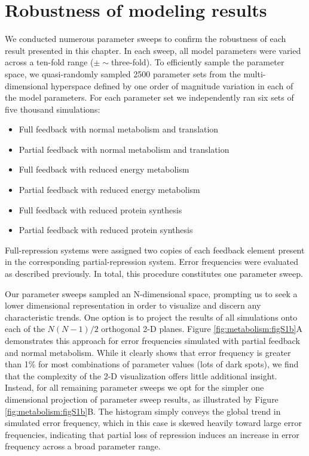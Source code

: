 \section{Robustness of modeling results}
\label{metabolism:robust}

We conducted numerous parameter sweeps to confirm the robustness of each result presented in this chapter. In each sweep, all model parameters were varied across a ten-fold range ($\pm \sim$three-fold). To efficiently sample the parameter space, we quasi-randomly sampled 2500 parameter sets from the multi-dimensional hyperspace defined by one order of magnitude variation in each of the model parameters. For each parameter set we independently ran six sets of five thousand simulations: 

\begin{itemize}
	\item Full feedback with normal metabolism and translation
	\item Partial feedback with normal metabolism and translation
	\item Full feedback with reduced energy metabolism
	\item Partial feedback with reduced energy metabolism
	\item Full feedback with reduced protein synthesis	
	\item Partial feedback with reduced protein synthesis
\end{itemize}

Full-repression systems were assigned two copies of each feedback element present in the corresponding partial-repression system. Error frequencies were evaluated as described previously. In total, this procedure constitutes one parameter sweep. 

Our parameter sweeps sampled an N-dimensional space, prompting us to seek a lower dimensional representation in order to visualize and discern any characteristic trends. One option is to project the results of all simulations onto each of the $N(N-1)/2$ orthogonal 2-D planes. Figure \ref{fig:metabolism:figS1b}A demonstrates this approach for error frequencies simulated with partial feedback and normal metabolism. While it clearly shows that error frequency is greater than 1\% for most combinations of parameter values (lots of dark spots), we find that the complexity of the 2-D visualization offers little additional insight. Instead, for all remaining parameter sweeps we opt for the simpler one dimensional projection of parameter sweep results, as illustrated by Figure \ref{fig:metabolism:figS1b}B. The histogram simply conveys the global trend in simulated error frequency, which in this case is skewed heavily toward large error frequencies, indicating that partial loss of repression induces an increase in error frequency across a broad parameter range. 

